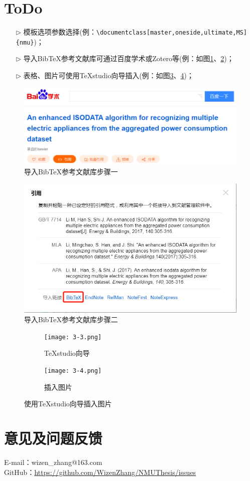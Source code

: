 \section{ToDo}
\begin{itemize}
  \item[$\triangleright$] 模板选项参数选择(例：\verb|\documentclass[master,oneside,ultimate,MS]{nmu}|)；
  \item[$\triangleright$] 导入BibTeX参考文献库可通过百度学术或Zotero等(例：如图\ref{fig:3-1}、\ref{fig:3-2})；
  \item[$\triangleright$] 表格、图片可使用TeXstudio向导插入(例：如图\ref{subfig:3a}、\ref{subfig:3b})；

\end{itemize}

\begin{figure}[tbh!]
	\centering
	\includegraphics[width=0.6\linewidth]{figures/sample/3-1}
	\caption{导入BibTeX参考文献库步骤一}
	\label{fig:3-1}
\end{figure}

\begin{figure}[tbh!]
	\centering
	\includegraphics[width=0.6\linewidth]{figures/sample/3-2}
	\caption{导入BibTeX参考文献库步骤二}
	\label{fig:3-2}
\end{figure}

\begin{figure}[htb!]
	\centering
	\begin{subfigure}[b]{.4\textwidth}
		\centering
		\texttt{[image: 3-3.png]}
		\caption{TeXstudio向导}\label{subfig:3a}
	\end{subfigure}
	\begin{subfigure}[b]{.4\textwidth}
		\centering
		\texttt{[image: 3-4.png]}
		\caption{插入图片}\label{subfig:3b}
	\end{subfigure}
	\caption{使用TeXstudio向导插入图片}\label{fig:3}
\end{figure}
\section{意见及问题反馈}

\indent E-mail：wizen\_zhang@163.com\\
\indent GitHub：\href{https://github.com/WizenZhang/NMUThesis/issues}{https://github.com/WizenZhang/NMUThesis/issues}


